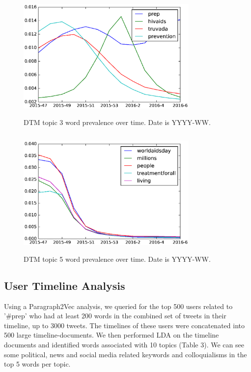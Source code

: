 \documentclass{sig-alternate-05-2015}
\begin{document}
\begin{figure}
\centering
\includegraphics[height=2.5in, width=3.5in]{fig1}
\caption{DTM topic 3 word prevalence over time. Date is YYYY-WW.}
\end{figure}

\begin{figure}
\centering
\includegraphics[height=2.5in, width=3.5in]{fig2}
\caption{DTM topic 5 word prevalence over time. Date is YYYY-WW.}
\end{figure}

\subsection{User Timeline Analysis}


Using a Paragraph2Vec analysis, we queried for the top 500 users related to '\#prep' who had at least 200 words in the combined set of tweets in their timeline, up to 3000 tweets. The timelines of these users were concatenated into 500 large timeline-documents. We then performed LDA on the timeline documents and identified words associated with 10 topics (Table 3). We can see some political, news and social media related keywords and colloquialisms in the top 5 words per topic.
\end{document}
